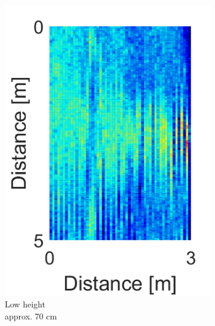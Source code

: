 \begin{minipage}{0.9\textwidth}

\begin{figure}[H]
\centering
\captionsetup{belowskip=0em}
\begin{subfigure}[b]{0.326\textwidth}
\includegraphics[width=\textwidth]{figures/Not_Norm_space_1.png}
\caption{Low height \\ approx. 70 cm}
\label{Not_norm_low}
\end{subfigure}
\begin{subfigure}[b]{0.326\textwidth}

\end{subfigure}
\end{figure}
\end{minipage}

